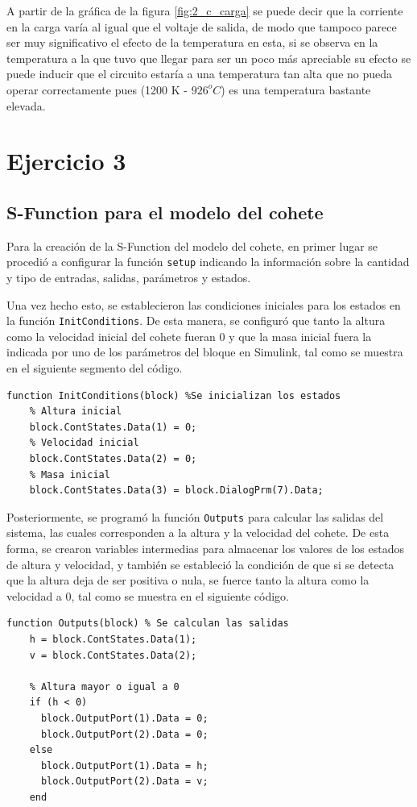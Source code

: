 \documentclass[12pt,letterpaper]{article}
\begin{document}
A partir de la gráfica de la figura \ref{fig:2_c_carga} se puede decir que la corriente en la carga varía al igual que el voltaje de salida, de modo que tampoco parece ser muy significativo el efecto de la temperatura en esta, si se observa en la temperatura a la que tuvo que llegar para ser un poco más apreciable su efecto se puede inducir que el circuito estaría a una temperatura tan alta que no pueda operar correctamente pues (1200 K - $926 ^o C$) es una temperatura bastante elevada.


\section{Ejercicio 3}

\subsection{S-Function para el modelo del cohete}
Para la creación de la S-Function del modelo del cohete, en primer lugar se procedió a configurar la
función \texttt{setup} indicando la información sobre la cantidad y tipo de entradas, salidas,
parámetros y estados.

Una vez hecho esto, se establecieron las condiciones iniciales para los estados en la función
\texttt{InitConditions}. De esta manera, se configuró que tanto la altura como la velocidad inicial
del cohete fueran 0 y que la masa inicial fuera la indicada por uno de los parámetros del bloque en
Simulink, tal como se muestra en el siguiente segmento del código.

\begin{lstlisting}[style=Matlab-editor, basicstyle=\mlttfamily]
  function InitConditions(block) %Se inicializan los estados
    % Altura inicial
    block.ContStates.Data(1) = 0;
    % Velocidad inicial
    block.ContStates.Data(2) = 0;
    % Masa inicial
    block.ContStates.Data(3) = block.DialogPrm(7).Data;
\end{lstlisting}

Posteriormente, se programó la función \texttt{Outputs} para calcular las salidas del sistema, las
cuales corresponden a la altura y la velocidad del cohete. De esta forma, se crearon variables
intermedias para almacenar los valores de los estados de altura y velocidad, y también se estableció la
condición de que si se detecta que la altura deja de ser positiva o nula, se fuerce tanto la altura
como la velocidad a 0, tal como se muestra en el siguiente código.

\begin{lstlisting}[style=Matlab-editor, basicstyle=\mlttfamily]
  function Outputs(block) % Se calculan las salidas
    h = block.ContStates.Data(1);
    v = block.ContStates.Data(2);

    % Altura mayor o igual a 0
    if (h < 0)
      block.OutputPort(1).Data = 0;
      block.OutputPort(2).Data = 0;
    else
      block.OutputPort(1).Data = h;
      block.OutputPort(2).Data = v;
    end
\end{lstlisting}
\end{document}
